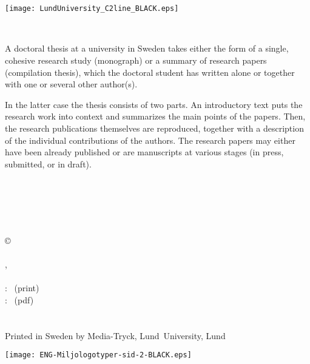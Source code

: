 \cleardoublepage
\thispagestyle{empty} %
~
\vfill
\begin{center}
  {\HUGE \myMainTitle}
  \\[2mm]
  {\huge \mySubTitle}

  \vfill
  {\myName}

  \vfill
  \texttt{[image: LundUniversity\_C2line\_BLACK.eps]}

  \\
\end{center}
\vfill


\newpage

\thispagestyle{empty} %

\noindent A doctoral thesis at a university in Sweden takes either the form of a single,
cohesive research study (monograph) or a summary of research papers
(compilation thesis), which the doctoral student has written alone or together
with one or several other author(s).

In the latter case the thesis consists of two parts. An introductory text puts
the research work into context and summarizes the main points of the papers.
Then, the research publications themselves are reproduced, together
with a description of the individual contributions of the authors. The
research papers may either have been already published or are manuscripts at
various stages (in press, submitted, or in draft).

\vfill
{\small
  \myCoverFront\\
  \\
  \myCoverBack\\
  \\
  \myFundingInformation


  \vspace{5mm}
  \noindent\copyright\, \myName~\myYear\\
  \\
  \myFaculty, {\myDepartment}
  \\
  \\
  \ISBN: \myISBNprint~(print)\\ %
  \ISBN: \myISBNpdf~(pdf)\\ %
  \mySeries\\
  \\
  Printed in Sweden by Media-Tryck, Lund~University, Lund~\myYear

  \medskip

  \noindent\texttt{[image: ENG-Miljologotyper-sid-2-BLACK.eps]}
}
